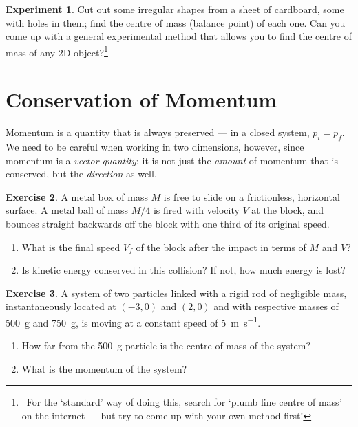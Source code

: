\documentclass[a4paper]{amsbook}
\theoremstyle{definition}
\newtheorem{exercise}{Exercise}
\numberwithin{exercise}{chapter}
\numberwithin{exercise}{chapter}
\newtheorem{experiment}[exercise]{Experiment}
\begin{document}
\begin{experiment}
  Cut out some irregular shapes from a sheet of cardboard, some with holes in them; find the centre of mass (balance point) of each one. Can
  you come up with a general experimental method that allows you to find the centre of mass of any 2D
  object?\footnote{~For the `standard' way of doing this, search for `plumb line centre of mass' on the
  internet --- but try to come up with your own method first!}
\end{experiment}

\section{Conservation of Momentum}
Momentum is a quantity that is always preserved --- in a closed system, $ p_i = p_f $. We need to be careful when working in two dimensions,
however, since momentum is a \emph{vector quantity}; it is not just the \emph{amount} of momentum that is conserved, but the \emph{direction}
as well.

\begin{exercise}
  A metal box of mass $ M $ is free to slide on a frictionless, horizontal surface. A metal ball of mass $ M/4 $ is fired with
  velocity $ V $ at the block, and bounces straight backwards off the block with one third of its original speed.
  \begin{enumerate}
    \item What is the final speed $ V_f $ of the block after the impact in terms of $ M $ and $ V $?
    \item Is kinetic energy conserved in this collision? If not, how much energy is lost?
  \end{enumerate}
\end{exercise}

\begin{exercise}
  A system of two particles linked with a rigid rod of negligible mass, instantaneously located at $ (-3,0) $ and $ (2, 0) $ and
  with respective masses of \SI{500}{\gram} and \SI{750}{\gram}, is moving at a constant speed of \SI{5}{\metre\per\second}.
  \begin{enumerate}
    \item How far from the \SI{500}{\gram} particle is the centre of mass of the system?
    \item What is the momentum of the system?
  \end{enumerate}
\end{exercise}
\end{document}
